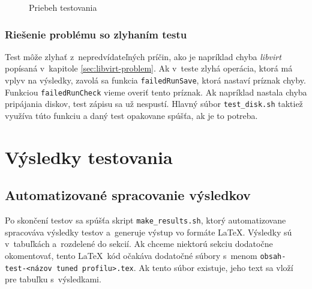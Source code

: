 \begin{figure}[H]
\begin{center}
  \caption{Priebeh testovania}
  \label{pic:testflow}
\end{center}
\end{figure}
%
%

\subsection{Riešenie problému so zlyhaním testu}
\label{sec:test-failure}

Test môže zlyhať z~nepredvídateľných príčin, ako je napríklad chyba
\emph{libvirt} popísaná v~kapitole \ref{sec:libvirt-problem}. Ak v~teste zlyhá
operácia, ktorá má vplyv na výsledky, zavolá sa funkcia \texttt{failedRunSave},
ktorá nastaví príznak chyby. Funkciou \texttt{failedRunCheck} vieme overiť
tento príznak. Ak napríklad nastala chyba pripájania diskov, test zápisu sa už
nespustí. Hlavný súbor \texttt{test\_disk.sh} taktiež využíva túto funkciu a
daný test opakovane spúšťa, ak je to potreba.

%
%

\chapter{Výsledky testovania}
\label{chap:test-results}

\section{Automatizované spracovanie výsledkov}

Po skončení testov sa spúšťa skript \texttt{make\_results.sh}, ktorý
automatizovane spracováva výsledky testov a~generuje výstup vo formáte \LaTeX.
Výsledky sú v~tabuľkách a~rozdelené do sekcií. Ak chceme niektorú sekciu
dodatočne okomentovať, tento \LaTeX~kód očakáva dodatočné súbory s~menom
\texttt{obsah-test-<názov tuned profilu>.tex}. Ak tento súbor existuje, jeho
text sa vloží pre tabuľku s~výsledkami.

